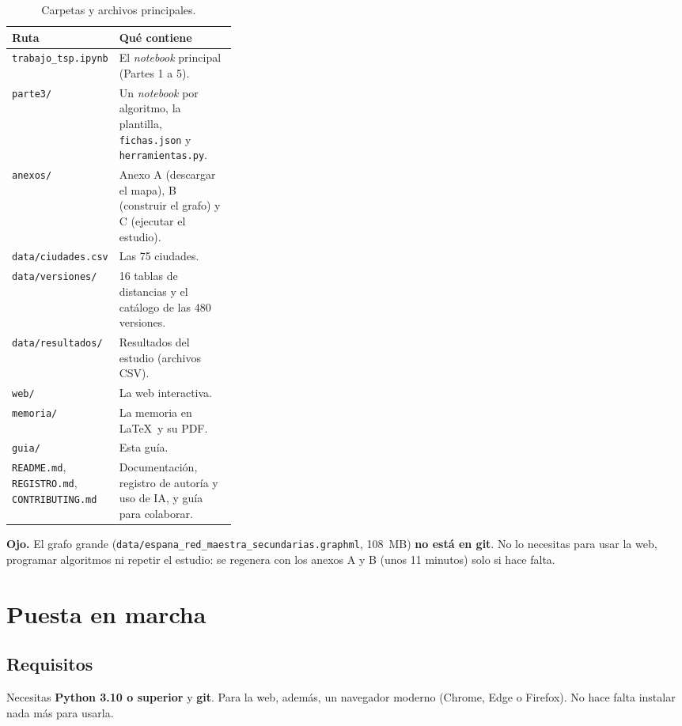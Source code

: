 \documentclass[11pt,a4paper,twoside,openany]{report}
\newcommand{\aviso}[1]{\par\vspace{0.5em}\noindent\begin{minipage}{\linewidth}\noindent\colorbox{amarillo!18}{\parbox{\dimexpr\linewidth-2\fboxsep}{\small\textbf{Ojo.} #1}}\end{minipage}\par\vspace{0.5em}}
\begin{document}
\begin{table}[htbp]
  \centering
  \caption{Carpetas y archivos principales.}
  \small
  \begin{tabularx}{\linewidth}{@{}>{\raggedright\arraybackslash}p{0.33\linewidth} X@{}}
    \toprule
    Ruta & Qué contiene \\
    \midrule
    \texttt{trabajo\_tsp.ipynb} & El \emph{notebook} principal (Partes 1 a 5). \\
    \texttt{parte3/} & Un \emph{notebook} por algoritmo, la plantilla, \texttt{fichas.json} y \texttt{herramientas.py}. \\
    \texttt{anexos/} & Anexo A (descargar el mapa), B (construir el grafo) y C (ejecutar el estudio). \\
    \texttt{data/ciudades.csv} & Las 75 ciudades. \\
    \texttt{data/versiones/} & 16 tablas de distancias y el catálogo de las 480 versiones. \\
    \texttt{data/resultados/} & Resultados del estudio (archivos CSV). \\
    \texttt{web/} & La web interactiva. \\
    \texttt{memoria/} & La memoria en \LaTeX\ y su PDF. \\
    \texttt{guia/} & Esta guía. \\
    \texttt{README.md}, \texttt{REGISTRO.md}, \texttt{CONTRIBUTING.md} & Documentación, registro de autoría y uso de IA, y guía para colaborar. \\
    \bottomrule
  \end{tabularx}
\end{table}

\aviso{El grafo grande (\texttt{data/espana\_red\_maestra\_secundarias.graphml}, 108~MB) \textbf{no está en git}. No lo necesitas para usar la web, programar algoritmos ni repetir el estudio: se regenera con los anexos A y B (unos 11 minutos) solo si hace falta.}

\chapter{Puesta en marcha}\label{g:inicio}

\section{Requisitos}

Necesitas \textbf{Python 3.10 o superior} y \textbf{git}. Para la web, además, un navegador moderno (Chrome, Edge o Firefox). No hace falta instalar nada más para usarla.
\end{document}
